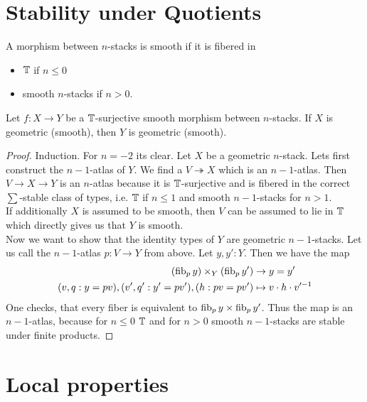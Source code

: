 \documentclass{article}
\begin{document}
\section{Stability under Quotients}
\begin{definition}
	A morphism between $n$-stacks is smooth if it is fibered in 
	\begin{itemize}
		\item $\mathbb{T}$ if $n \le 0$
		\item smooth $n$-stacks if $n > 0$.
	\end{itemize}
\end{definition}
\begin{theorem}{\label{thm:quotients}}
	Let $f : X \to Y$ be a $\mathbb{T}$-surjective smooth morphism between $n$-stacks. If $X$ is geometric (smooth), then $Y$ is geometric (smooth).
\end{theorem}
\begin{proof}
	Induction.
	For $n = -2$ its clear.
	Let $X$ be a geometric $n$-stack. Lets first construct the $n-1$-atlas of $Y$.
	We find a $V \twoheadrightarrow X$ which is an $n-1$-atlas.  Then $V \to X \to Y$ is an $n$-atlas because it is $\mathbb{T}$-surjective and is fibered in the correct $\sum$-stable class of types, i.e. $\mathbb{T}$ if $n \le 1$ and  smooth $n-1$-stacks for $n > 1$. \\
	If additionally $X$ is assumed to be smooth, then $V$ can be assumed to lie in $\mathbb{T}$ which directly gives us that $Y$ is smooth. \\
	Now we want to show that the identity types of $Y$ are geometric $n-1$-stacks. Let us call the $n-1$-atlas $p : V \to Y$ from above. Let $y,y' : Y$.  Then we have the map
	\begin{align*}
		(\operatorname{fib}_p y) \times_Y (\operatorname{fib}_p y') &\to y = y' \\
		(v , q : y = p v) , (v', q' : y' = p v') , (h : p v = p v') &\mapsto v \cdot h \cdot v'^{-1}
	\end{align*}
	One checks, that every fiber is equivalent to $\operatorname{fib}_p y \times \operatorname{fib}_p y'$. Thus the map is an $n-1$-atlas, because for $n \le 0$ $\mathbb{T}$ and for $n > 0$ smooth $n-1$-stacks are stable under finite products.
\end{proof}
\section{Local properties}
\end{document}
